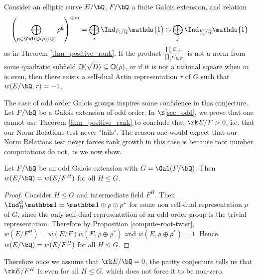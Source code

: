 \begin{conj}\label{conj_normtwist}
Consider an elliptic curve $E / \bQ$, $F / \bQ$ a finite Galois extension, and relation 
$$\left(\bigoplus_{\mathfrak{g}\in\Gal(\QQ(\rho)/\QQ)}\rho^{\mathfrak{g}}\right)^{\oplus m}=\bigoplus_i\Ind_{F_i/\QQ}\mathds{1}\ominus\bigoplus_j\Ind_{F'_j/\QQ}\mathds{1}$$
as in Theorem \ref{thm_positive_rank}. If the product $\frac{\prod_i C_{E/F_i}}{\prod_j C_{E/F'_j}}$ is not a norm from some quadratic subfield $\mathbb{Q}(\sqrt{D})\subseteq\mathbb{Q}(\rho)$, or if it is not a rational square when $m$ is even, then there exists a self-dual Artin representation $\tau$ of $G$ such that $w(E / \bQ, \tau) = -1 $. 
\end{conj}

The case of odd order Galois groups inspires some confidence in this conjecture. Let $F / \bQ$ be a Galois extension of odd order. In $\S$\ref{sec_odd}, we prove that one cannot use Theorem \ref{thm_positive_rank} to conclude that $\rk E / F > 0$, i.e. that our Norm Relations test never "fails".
The reason one would expect that our Norm Relations test never forces rank growth in this case is because root number computations do not, as we now show.

\begin{lemma}\label{lem_oddroot}
 Let $F / \bQ$ be an odd Galois extension with $G = \Gal(F / \bQ)$. Then $w(E / \bQ) = w(E / F^H)$ for all $H \leq G$. 
\end{lemma}

\begin{proof}
Consider $H \leq G$ and intermediate field $F^H$. Then 
$\Ind_H^G \trivial \simeq \trivial \oplus 
\rho \oplus \rho^*$ for some non self-dual representation $\rho$ of $G$, since the only self-dual representation of an odd-order group is the trivial representation. Therefore by Proposition \ref{compute-root-twist}, $w(E / F^H) = w(E / F)w(E, \rho \oplus \rho^*)$ and $w(E, \rho \oplus \rho^*) = 1$. Hence $w(E / \bQ) = w(E / F^H)$ for all $H \leq G$. 
\end{proof}

Therefore once we assume that $\rk E / \bQ = 0$, the parity conjecture tells us that $\rk E / F^H$ is even for all $H \leq G$, which does not force it to be non-zero. 

